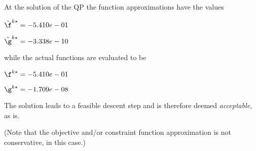 At the solution of the QP the function approximations have the values

$\tilde \f^{k\star} = -5.410e-01$

$\tilde \g^{k\star} = -3.338e-10$

\bigskip
while the actual functions are evaluated to be

$\f^{k\star} = -5.410e-01$

$\g^{k\star} = -1.709e-08$

\bigskip
 The solution leads to a feasible descent step and                     is therefore deemed \emph{acceptable}, as is. 
 
(Note that the objective and/or constraint function approximation                         is not conservative, in this case.)